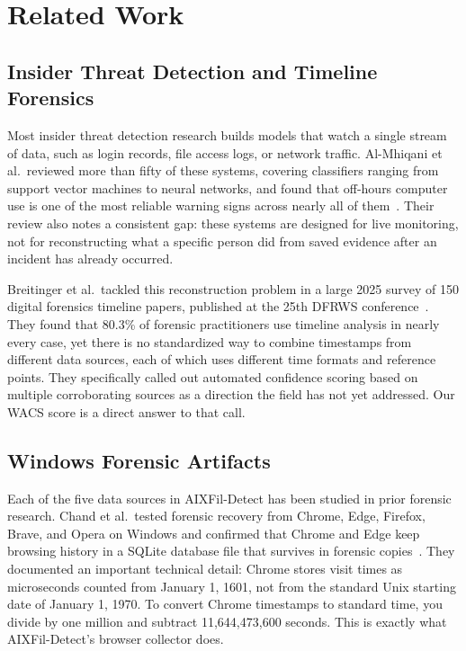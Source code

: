 \documentclass[conference]{IEEEtran}
\begin{document}
\section{Related Work}
\label{sec:related}

\subsection{Insider Threat Detection and Timeline Forensics}

Most insider threat detection research builds models that watch a single
stream of data, such as login records, file access logs, or network
traffic. Al-Mhiqani et al.\ reviewed more than fifty of these systems,
covering classifiers ranging from support vector machines to neural
networks, and found that off-hours computer use is one of the most
reliable warning signs across nearly all of
them~\cite{almhiqani2020review}. Their review also notes a consistent
gap: these systems are designed for live monitoring, not for
reconstructing what a specific person did from saved evidence after an
incident has already occurred.

Breitinger et al.\ tackled this reconstruction problem in a large 2025
survey of 150 digital forensics timeline papers, published at the 25th
DFRWS conference~\cite{breitinger2025sok}. They found that 80.3\% of
forensic practitioners use timeline analysis in nearly every case, yet
there is no standardized way to combine timestamps from different data
sources, each of which uses different time formats and reference points.
They specifically called out automated confidence scoring based on
multiple corroborating sources as a direction the field has not yet
addressed. Our WACS score is a direct answer to that call.

\subsection{Windows Forensic Artifacts}

Each of the five data sources in AIXFil-Detect has been studied in
prior forensic research. Chand et al.\ tested forensic recovery from
Chrome, Edge, Firefox, Brave, and Opera on Windows and confirmed that
Chrome and Edge keep browsing history in a SQLite database file that
survives in forensic copies~\cite{chand2025browser}. They documented an
important technical detail: Chrome stores visit times as microseconds
counted from January 1, 1601, not from the standard Unix starting date
of January 1, 1970. To convert Chrome timestamps to standard time, you
divide by one million and subtract 11,644,473,600 seconds. This is
exactly what AIXFil-Detect's browser collector does.
\end{document}
